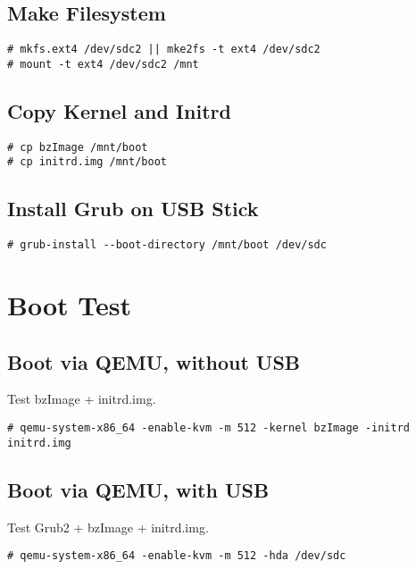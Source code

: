 \documentclass[10pt,a4paper]{article}
\begin{document}
\subsection{Make Filesystem}
\begin{framed}\begin{verbatim}
# mkfs.ext4 /dev/sdc2 || mke2fs -t ext4 /dev/sdc2
# mount -t ext4 /dev/sdc2 /mnt
\end{verbatim}\end{framed}
\subsection{Copy Kernel and Initrd}
\begin{framed}\begin{verbatim}
# cp bzImage /mnt/boot
# cp initrd.img /mnt/boot
\end{verbatim}\end{framed}
\subsection{Install Grub on USB Stick}
\begin{framed}\begin{verbatim}
# grub-install --boot-directory /mnt/boot /dev/sdc
\end{verbatim}\end{framed}

\section{Boot Test}
\subsection{Boot via QEMU, without USB}
Test bzImage + initrd.img. 
\begin{framed}\begin{verbatim}
# qemu-system-x86_64 -enable-kvm -m 512 -kernel bzImage -initrd initrd.img
\end{verbatim}\end{framed}
\subsection{Boot via QEMU, with USB}
Test Grub2 + bzImage + initrd.img.
\begin{framed}\begin{verbatim}
# qemu-system-x86_64 -enable-kvm -m 512 -hda /dev/sdc
\end{verbatim}\end{framed}
\end{document}
